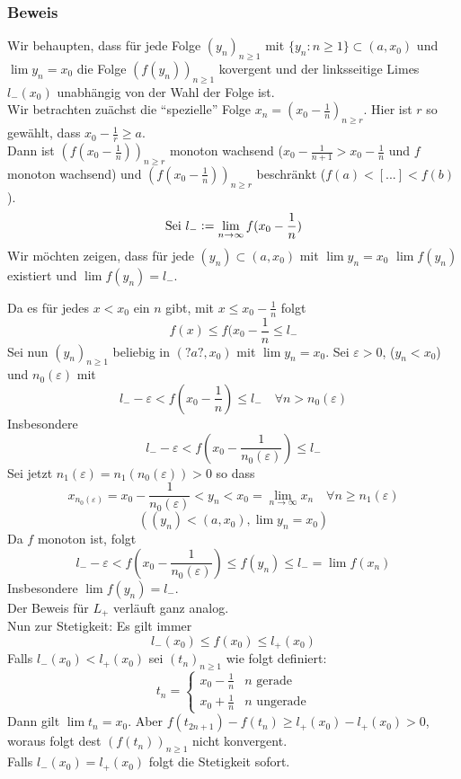 \subsubsection*{Beweis}
Wir behaupten, dass für jede Folge $(y_{n})_{n\geq 1}$ mit $\{y_{n}:n\geq 1\} \subset (a,x_{0})$ und $\lim{y_{n}} = x_{0}$ die Folge $(f(y_{n}))_{n\geq 1}$ kovergent und der linksseitige Limes $l_{-}(x_{0})$ unabhängig von der Wahl der Folge ist.
 \\

\noindent Wir betrachten zuächst die ``spezielle'' Folge $x_{n}=(x_{0}-\frac{1}{n})_{n\geq r}$. Hier ist $r$ so gewählt, dass $x_{0}-\frac{1}{r}\geq a$. \\
Dann ist $(f(x_{0}-\frac{1}{n}))_{n\geq r}$ monoton wachsend ($x_{0}-\frac{1}{n+1} > x_{0}-\frac{1}{n}$ und $f$ monoton wachsend) und $(f(x_{0}-\frac{1}{n}))_{n\geq r}$ beschränkt ($f(a)<[...]<f(b)$).
\[\text{Sei }l_{-}\vcentcolon=\lim_{n\to\infty}{f(x_{0}-\frac{1}{n})}\]
\noindent Wir möchten zeigen, dass für jede $(y_{n})\subset (a, x_{0})$ mit $\lim{y_{n}}=x_{0}$ $\lim{f(y_{n})}$ existiert und $\lim{f(y_{n})}=l_{-}$. 

Da es für jedes $x<x_{0}$ ein $n$ gibt, mit $x\leq x_{0}-\frac{1}{n}$ folgt \[f(x) \leq f(x_{0}-\frac{1}{n} \leq l_{-}\]
Sei nun $(y_{n})_{n\geq 1}$ beliebig in $(?a?, x_{0})$ mit $\lim{y_{n}}=x_{0}$. Sei $\varepsilon > 0$, ($y_{n} < x_{0}$) und $n_{0}(\varepsilon)$ mit \[l_{-}-\varepsilon < f(x_{0}-\frac{1}{n})\leq l_{-} \quad \forall n>n_{0}(\varepsilon) \]
Insbesondere
\[l_{-} - \varepsilon < f(x_{0}-\frac{1}{n_{0}(\varepsilon)}) \leq l_{-} \]
Sei jetzt $n_{1}(\varepsilon)=n_{1}(n_{0}(\varepsilon))>0$ so dass \[ x_{n_{0}(\varepsilon)} = x_{0} - \frac{1}{n_{0}(\varepsilon)} < y_{n} < x_{0} = \lim_{n\to\infty}{x_{n}} \quad \forall n \geq n_{1}(\varepsilon)\]
\[ \left((y_{n})<(a,x_{0}), \lim{y_{n}}=x_{0}\right)\]
Da $f$ monoton ist, folgt \[ l_{-} - \varepsilon < f(x_{0}-\frac{1}{n_{0}(\varepsilon)}) \leq f(y_{n}) \leq l_{-} = \lim{f(x_{n})} \]
Insbesondere $\lim{f(y_{n})} = l_{-}$. \\

\noindent Der Beweis für $L_{+}$ verläuft ganz analog. \\

\noindent Nun zur Stetigkeit: Es gilt immer \[ l_{-}(x_{0})\leq f(x_{0}) \leq l_{+}(x_{0}) \]
Falls $l_{-}(x_{0}) < l_{+}(x_{0})$ sei $(t_{n})_{n \geq 1}$ wie folgt definiert:
\[ t_{n}=\begin{cases}x_{0}-\frac{1}{n} &n\text{ gerade} \\ x_{0}+\frac{1}{n} &n\text{ ungerade} \end{cases} \]
Dann gilt $\lim{t_{n}} = x_{0}$. Aber $f(t_{2n+1})-f(t_{n}) \geq l_{+}(x_{0})-l_{+}(x_{0}) >0$, woraus folgt dest  $(f(t_{n}))_{n\geq1}$ nicht konvergent. \\
Falls $l_{-}(x_{0})=l_{+}(x_{0})$ folgt die Stetigkeit sofort. 

